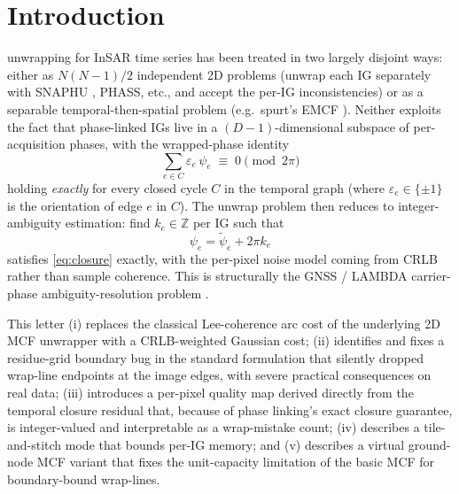 \documentclass[journal]{IEEEtran}
\begin{document}

\section{Introduction}\label{sec:intro}

 unwrapping for InSAR time series has been treated in
two largely disjoint ways: either as $N(N-1)/2$ independent 2D problems
(unwrap each IG separately with SNAPHU \cite{snaphu}, PHASS, etc., and
accept the per-IG inconsistencies) or as a separable temporal-then-spatial
problem (e.g.\ spurt's EMCF \cite{spurt}). Neither exploits the
fact that phase-linked IGs \cite{phaselink-emi,phaselink-evd} live in a
$(D-1)$-dimensional subspace of per-acquisition phases, with
the wrapped-phase identity
\begin{equation}
\sum_{e\in C} \varepsilon_e\,\psi_e \;\equiv\; 0 \pmod{2\pi}
\label{eq:closure}
\end{equation}
holding \emph{exactly} for every closed cycle $C$ in the temporal graph
(where $\varepsilon_e\in\{\pm 1\}$ is the orientation of edge $e$ in
$C$). The unwrap problem then reduces to integer-ambiguity estimation:
find $k_e\in\mathbb{Z}$ per IG such that
\begin{equation}
\psi_e = \tilde\psi_e + 2\pi k_e
\end{equation}
satisfies \eqref{eq:closure} exactly, with the per-pixel noise model
coming from CRLB rather than sample coherence. This is structurally the
GNSS / LAMBDA carrier-phase ambiguity-resolution problem \cite{lambda}.

This letter (i) replaces the classical Lee-coherence arc cost of the
underlying 2D MCF unwrapper \cite{carballo,whirlwind} with a
CRLB-weighted Gaussian cost; (ii) identifies and fixes a residue-grid
boundary bug in the standard formulation that silently dropped
wrap-line endpoints at the image edges, with severe practical
consequences on real data; (iii) introduces a per-pixel quality map
derived directly from the temporal closure residual that, because of
phase linking's exact closure guarantee, is integer-valued and
interpretable as a wrap-mistake count; (iv) describes a tile-and-stitch
mode that bounds per-IG memory; and (v) describes a virtual ground-node
MCF variant that fixes the unit-capacity limitation of the basic MCF
for boundary-bound wrap-lines.

\end{document}
